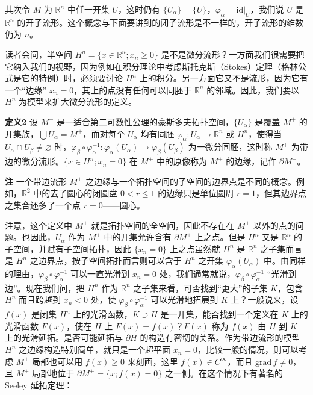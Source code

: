 其次令 $M$ 为 $\mathbb R^n$ 中任一开集 $U$，这时仍有 $\{U_\alpha\}=\{U\}$，$\varphi_\alpha=\mathrm{id}|_U$，我们说 $U$ 是 $\mathbb R^n$ 的开子流形。这个概念与下面要讲到的闭子流形是不一样的，开子流形的维数仍为 $n$。

读者会问，半空间 $H^n=\{x\in\mathbb R^n;x_n\ge0\}$ 是不是微分流形？一方面我们很需要把它纳入我们的视野，因为例如在积分理论中考虑斯托克斯（Stokes）定理（格林公式是它的特例）时，必须要讨论 $H^n$ 上的积分。另一方面它又不是流形，因为它有一个“边缘” $x_n=0$，其上的点没有任何可以同胚于 $\mathbb R^n$ 的邻域。因此，我们要以 $H^n$ 为模型来扩大微分流形的定义。

\noindent\textbf{定义2}\quad
设 $M^+$ 是一适合第二可数性公理的豪斯多夫拓扑空间，$\{U_\alpha\}$ 是覆盖 $M^+$ 的开集族，$\bigcup U_\alpha=M^+$，而对每个 $U_\alpha$ 均有同胚 $\varphi_\alpha:U_\alpha\to\mathbb R^n$ 或 $H^n$，使得当 $U_\alpha\cap U_\beta\ne\varnothing$ 时，$\varphi_\beta\circ\varphi_\alpha^{-1}:\varphi_\alpha(U_\alpha)\to\varphi_\beta(U_\beta)$ 为一微分同胚，这时称 $M^+$ 为带边的微分流形。$\{x\in H^n;x_n=0\}$ 在 $M^+$ 中的原像称为 $M^+$ 的边缘，记作 $\partial M^+$。

\noindent\textbf{注}\quad
一个带边流形 $M^+$ 之边缘与一个拓扑空间的子空间的边界点是不同的概念。例如，$\mathbb R^2$ 中的去了圆心的闭圆盘 $0<r\le1$ 的边缘只是单位圆周 $r=1$，但其边界点之集合还多了一个点 $r=0$——圆心。

注意，这个定义中 $M^+$ 就是拓扑空间的全空间，因此不存在在 $M^+$ 以外的点的问题。也因此，$U_\alpha$ 作为 $M^+$ 中的开集允许含有 $\partial M^+$ 上之点。但是 $H^n$ 又是 $\mathbb R^n$ 的子空间，并赋有子空间拓扑，因此 $\{x_n=0\}$ 上之点虽然就 $H^n$ 是 $\mathbb R^n$ 之子集而言是 $H^n$ 之边界点，按子空间拓扑而言则可以含于 $H^n$ 之开集 $\varphi_\alpha(U_\alpha)$ 中。由同样的理由，$\varphi_\beta\circ\varphi_\alpha^{-1}$ 可以一直光滑到 $x_n=0$ 处，我们通常就说，$\varphi_\beta\circ\varphi_\alpha^{-1}$ “光滑到边”。现在我们问，把 $H^n$ 作为 $\mathbb R^n$ 之子集来看，可否找到“更大”的子集 $K$，包含 $H^n$ 而且跨越到 $x_n<0$ 处，使 $\varphi_\beta\circ\varphi_\alpha^{-1}$ 可以光滑地拓展到 $K$ 上？一般说来，设 $f(x)$ 是闭集 $H^n$ 上的光滑函数，$K\supset H$ 是一开集，能否找到一个定义在 $K$ 上的光滑函数 $F(x)$，使在 $H$ 上 $F(x)=f(x)$？$F(x)$ 称为 $f(x)$ 由 $H$ 到 $K$ 上的光滑延拓。是否可能延拓与 $\partial H$ 的构造有密切的关系。作为带边流形的模型 $H^n$ 之边缘构造特别简单，就只是一个超平面 $x_n=0$，比较一般的情况，则可以考虑 $M^+$ 局部也可以用 $f(x)\ge0$ 来刻画，这里 $f(x)\in C^\infty$，而且 $\mathrm{grad}\,f\ne0$，且 $M^+$ 局部地位于 $\partial M^+=\{x;f(x)=0\}$ 之一侧。在这个情况下有著名的 Seeley 延拓定理：

